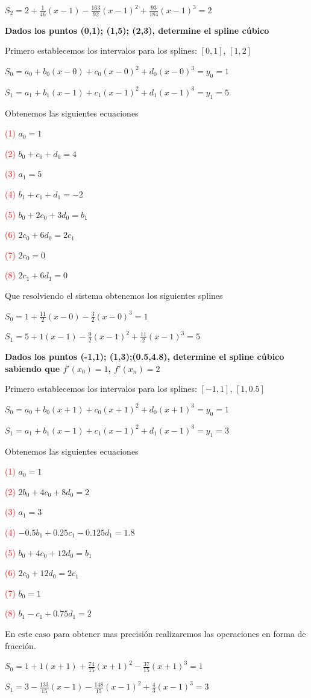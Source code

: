 \documentclass[12pt]{article}
\begin{document}
$S_2 = 2+\frac{1}{46}(x-1)-\frac{163}{92}(x-1)^2+\frac{93}{184}(x-1)^3 = 2$


\textbf{Dados los puntos (0,1); (1,5); (2,3), determine el spline cúbico}

Primero establecemos los intervalos para los splines: $[0,1]$, $[1,2]$

$S_0 = a_0+b_0(x-0)+c_0(x-0)^2+d_0(x-0)^3 = y_0 = 1$

$S_1 = a_1+b_1(x-1)+c_1(x-1)^2+d_1(x-1)^3 = y_1 = 5$

Obtenemos las siguientes ecuaciones


\textcolor{red}{(1)} $a_0 = 1$

\textcolor{red}{(2)} $b_0+c_0+d_0 = 4$

\textcolor{red}{(3)} $a_1 = 5$

\textcolor{red}{(4)} $b_1+c_1+d_1 = -2$

\textcolor{red}{(5)} $b_0+2c_0+3d_0=b_1$

\textcolor{red}{(6)} $2c_0+6d_0=2c_1$

\textcolor{red}{(7)} $2c_0=0$

\textcolor{red}{(8)} $2c_1+6d_1=0$

Que resolviendo el sistema obtenemos los siguientes splines

$S_0 = 1+\frac{11}{2}(x-0)-\frac{3}{2}(x-0)^3 = 1$

$S_1 = 5+1(x-1)-\frac{9}{2}(x-1)^2+\frac{11}{2}(x-1)^3 = 5$



\textbf{Dados los puntos (-1,1); (1,3);(0.5,4.8), determine el spline cúbico sabiendo que  $f'(x_0) = 1$, $f' (x_n) = 2$}

Primero establecemos los intervalos para los splines: $[-1,1]$, $[1,0.5]$

$S_0 = a_0+b_0(x+1)+c_0(x+1)^2+d_0(x+1)^3 = y_0 = 1$

$S_1 = a_1+b_1(x-1)+c_1(x-1)^2+d_1(x-1)^3 = y_1 = 3$

Obtenemos las siguientes ecuaciones


\textcolor{red}{(1)} $a_0 = 1$

\textcolor{red}{(2)} $2b_0+4c_0+8d_0 = 2$

\textcolor{red}{(3)} $a_1 = 3$

\textcolor{red}{(4)} $-0.5b_1+0.25c_1-0.125d_1 = 1.8$

\textcolor{red}{(5)} $b_0+4c_0+12d_0=b_1$

\textcolor{red}{(6)} $2c_0+12d_0=2c_1$

\textcolor{red}{(7)} $b_0=1$

\textcolor{red}{(8)} $b_1-c_1+0.75d_1=2$

En este caso para obtener mas precisión realizaremos las operaciones en forma de fracción. 

$S_0 = 1+1(x+1)+\frac{74}{15}(x+1)^2-\frac{37}{15}(x+1)^3 =1$

$S_1 = 3-\frac{133}{15}(x-1)-\frac{148}{15}(x-1)^2+\frac{4}{3}(x-1)^3 = 3$

\vspace{0.5cm}


\renewcommand{\refname}{\MakeUppercase{REFERENCIAS}}


\end{document}
